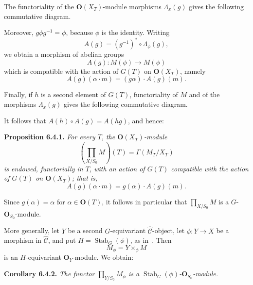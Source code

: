 The functoriality of the \(\mathbf O(X_T)\)-module morphisms
\(\Lambda_x(g)\) gives the following commutative diagram.

\begin{figure}[H]
  \centering
  
  \label{fig:sga3-exp1-p042-section-naturality-square}
\end{figure}

Moreover, \(g\phi g^{-1}=\phi\), because \(\phi\) is the identity.
Writing
\[
  A(g)=(g^{-1})^*\circ\Lambda_\phi(g),
\]
we obtain a morphism of abelian groups
\[
  A(g):M(\phi)\longrightarrow M(\phi)
\]
which is compatible with the action of \(G(T)\) on
\(\mathbf O(X_T)\), namely
\[
  A(g)(\alpha\cdot m)=(g\alpha)\cdot A(g)(m).
\]

Finally, if \(h\) is a second element of \(G(T)\), functoriality of
\(M\) and of the morphisms \(\Lambda_x(g)\) gives the following
commutative diagram.

\begin{figure}[H]
  \centering
  
  \label{fig:sga3-exp1-p042-section-action-composition}
\end{figure}

It follows that \(A(h)\circ A(g)=A(hg)\), and hence:

\medskip
\noindent{}\textbf{Proposition 6.4.1.}
\textit{For every \(T\), the \(\mathbf O(X_T)\)-module
\[
  \left(\prod_{X/S_0}M\right)(T)=\Gamma(M_T/X_T)
\]
is endowed, functorially in \(T\), with an action of \(G(T)\) compatible
with the action of \(G(T)\) on \(\mathbf O(X_T)\); that is,}
\[
  A(g)(\alpha\cdot m)=g(\alpha)\cdot A(g)(m).
\]

Since \(g(\alpha)=\alpha\) for \(\alpha\in\mathbf O(T)\), it follows in
particular that \(\prod_{X/S_0}M\) is a
\(G\)-\(\mathbf O_{S_0}\)-module.

More generally, let \(Y\) be a second \(G\)-equivariant
\(\widehat{\mathscr C}\)-object, let \(\phi:Y\to X\) be a morphism in
\(\widehat{\mathscr C}\), and put \(H=\operatorname{Stab}_G(\phi)\), as
in~. Then
\[
  M_\phi=Y\times_\phi M
\]
is an \(H\)-equivariant \(\mathbf O_Y\)-module. We obtain:

\medskip
\noindent{}\textbf{Corollary 6.4.2.}
\textit{The functor \(\prod_{Y/S_0}M_\phi\) is a
\(\operatorname{Stab}_G(\phi)\)-\(\mathbf O_{S_0}\)-module.}

